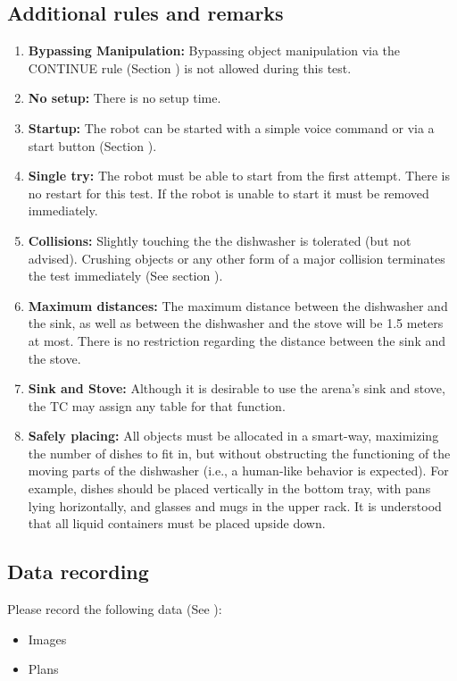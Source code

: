 \subsection{Additional rules and remarks}
\begin{enumerate}
	\item \textbf{Bypassing Manipulation:} Bypassing object manipulation via the CONTINUE rule (Section ) is not allowed during this test.
	\item \textbf{No setup:} There is no setup time.
	\item \textbf{Startup:} The robot can be started with a simple voice command or via a start button (Section ). 
	\item \textbf{Single try:} The robot must be able to start from the first attempt. There is no restart for this test. If the robot is unable to start it must be removed immediately.
	\item \textbf{Collisions:} Slightly touching the the dishwasher is tolerated (but not advised). Crushing objects or any other form of a major collision terminates the test immediately (See section ).
	\item \textbf{Maximum distances:} The maximum distance between the dishwasher and the sink, as well as between the dishwasher and the stove will be 1.5 meters at most. There is no restriction regarding the distance between the sink and the stove.
	\item \textbf{Sink and Stove:} Although it is desirable to use the arena's sink and stove, the TC may assign any table for that function.
	\item \textbf{Safely placing:} All objects must be allocated in a smart-way, maximizing the number of dishes to fit in, but without obstructing the functioning of the moving parts of the dishwasher (i.e., a human-like behavior is expected). For example, dishes should be placed vertically in the bottom tray, with pans lying horizontally, and glasses and mugs in the upper rack. It is understood that all liquid containers must be placed upside down.
\end{enumerate}

\subsection{Data recording}
Please record the following data (See ):
\begin{itemize}
	\item Images
	\item Plans
\end{itemize}

